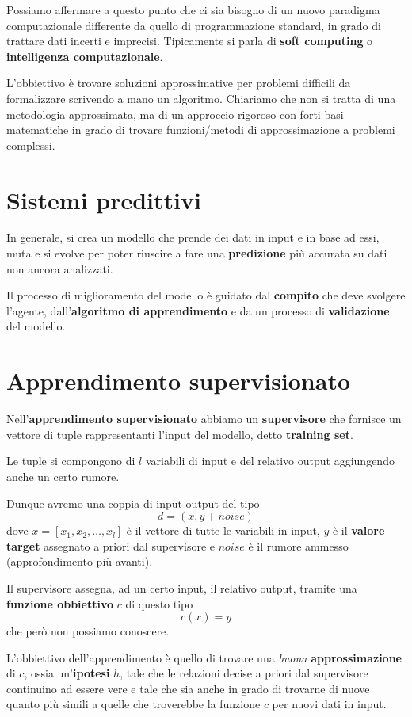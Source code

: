 Possiamo affermare a questo punto che ci sia bisogno di un nuovo paradigma computazionale differente da quello di
programmazione standard, in grado di trattare dati incerti e imprecisi. Tipicamente si parla di \textbf{soft computing} o
\textbf{intelligenza computazionale}.

L'obbiettivo \`e trovare soluzioni approssimative per problemi difficili da formalizzare scrivendo a mano un algoritmo.
Chiariamo che non si tratta di una metodologia approssimata, ma di un approccio rigoroso con forti basi
matematiche in grado di trovare funzioni/metodi di approssimazione a problemi complessi.

\section{Sistemi predittivi}
In generale, si crea un modello che prende dei dati in input e in base ad essi, muta e si evolve per poter riuscire a
fare una \textbf{predizione} pi\`u accurata su dati non ancora analizzati.

Il processo di miglioramento del modello \`e guidato dal \textbf{compito} che deve svolgere l'agente,
dall'\textbf{algoritmo di apprendimento} e da un processo di \textbf{validazione} del modello.

\section{Apprendimento supervisionato}
Nell'\textbf{apprendimento supervisionato} abbiamo un \textbf{supervisore} che fornisce un vettore di tuple rappresentanti
l'input del modello, detto \textbf{training set}.

Le tuple si compongono di $l$ variabili di input e del relativo output aggiungendo anche un certo rumore.

Dunque avremo una coppia di input-output del tipo
\[ d = (x, y + noise) \]
dove $x = [x_1, x_2, \dots, x_l]$ \`e il vettore di tutte le variabili in input, $y$ \`e il \textbf{valore target}
assegnato a priori dal supervisore e $noise$ \`e il rumore ammesso (approfondimento pi\`u avanti).

Il supervisore assegna, ad un certo input, il relativo output, tramite una \textbf{funzione obbiettivo} $c$ di questo tipo
\[ c(x) = y \]
che per\`o non possiamo conoscere.

L'obbiettivo dell'apprendimento \`e quello di trovare una \emph{buona} \textbf{approssimazione} di $c$, ossia
un'\textbf{ipotesi} $h$, tale che le relazioni decise a priori dal supervisore continuino ad essere vere e tale che sia
anche in grado di trovarne di nuove quanto pi\`u simili a quelle che troverebbe la funzione $c$ per nuovi dati in input.

